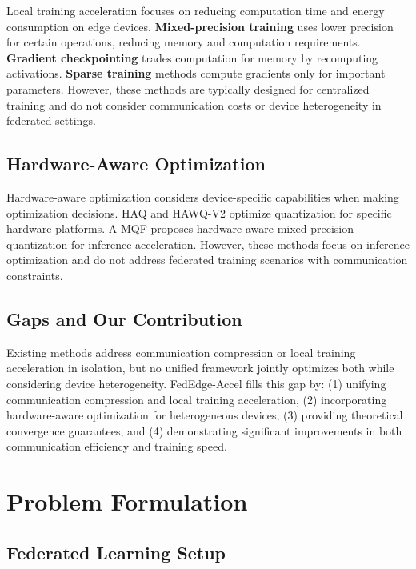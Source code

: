 \documentclass[journal]{IEEEtran}
\begin{document}
Local training acceleration focuses on reducing computation time and energy consumption on edge devices. \textbf{Mixed-precision training} \cite{micikevicius2018mixed} uses lower precision for certain operations, reducing memory and computation requirements. \textbf{Gradient checkpointing} \cite{chen2016training} trades computation for memory by recomputing activations. \textbf{Sparse training} methods \cite{wang2020picking} compute gradients only for important parameters. However, these methods are typically designed for centralized training and do not consider communication costs or device heterogeneity in federated settings.

\subsection{Hardware-Aware Optimization}

Hardware-aware optimization considers device-specific capabilities when making optimization decisions. HAQ \cite{wang2019haq} and HAWQ-V2 \cite{wang2020hawq} optimize quantization for specific hardware platforms. A-MQF \cite{yazdani2024amqf} proposes hardware-aware mixed-precision quantization for inference acceleration. However, these methods focus on inference optimization and do not address federated training scenarios with communication constraints.

\subsection{Gaps and Our Contribution}

Existing methods address communication compression or local training acceleration in isolation, but no unified framework jointly optimizes both while considering device heterogeneity. FedEdge-Accel fills this gap by: (1) unifying communication compression and local training acceleration, (2) incorporating hardware-aware optimization for heterogeneous devices, (3) providing theoretical convergence guarantees, and (4) demonstrating significant improvements in both communication efficiency and training speed.

\section{Problem Formulation}
\label{sec:problem_formulation}

\subsection{Federated Learning Setup}
\end{document}
